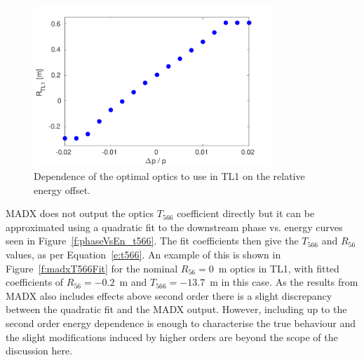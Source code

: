 \begin{figure}
  \centering
  \includegraphics[width=0.8\textwidth]{Figures/propagation/optR56vsEnergy}
  \caption{Dependence of the optimal optics to use in TL1 on the relative energy offset.}
  \label{f:optR56vsEnergy}
\end{figure}


MADX does not output the optics \(T_{566}\) coefficient directly but it can be approximated using a quadratic fit to the downstream phase vs. energy curves seen in Figure~\ref{f:phaseVsEn_t566}. The fit coefficients then give the \(T_{566}\) and \(R_{56}\) values, as per Equation~\ref{e:t566}. An example of this is shown in Figure~\ref{f:madxT566Fit} for the nominal \(R_{56}=0\)~m optics in TL1, with fitted coefficients of \(R_{56}=-0.2\)~m and \(T_{566}=-13.7\)~m in this case. As the results from MADX also includes effects above second order there is a slight discrepancy between the quadratic fit and the MADX output. However, including up to the second order energy dependence is enough to characterise the true behaviour and the slight modifications induced by higher orders are beyond the scope of the discussion here.



